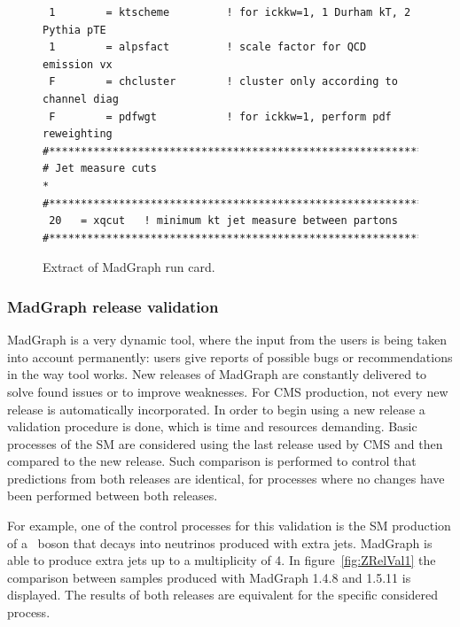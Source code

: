 \begin{itemize}
\begin{figure}[!Hhtbp]
\begin{center}
\begin{minipage}[c]{0.7\textwidth}
\begin{verbatim}
 1        = ktscheme         ! for ickkw=1, 1 Durham kT, 2 Pythia pTE
 1        = alpsfact         ! scale factor for QCD emission vx
 F        = chcluster        ! cluster only according to channel diag
 F        = pdfwgt           ! for ickkw=1, perform pdf reweighting
#*********************************************************************
# Jet measure cuts                                                   *
#*********************************************************************
 20   = xqcut   ! minimum kt jet measure between partons
#*********************************************************************
\end{verbatim}
\normalsize
        \end{minipage}
          \caption{Extract of MadGraph run card.}
          \label{fig:RunCard}
      \end{center}
    \end{figure}

\end{itemize}


\subsubsection{MadGraph release validation}

MadGraph is a very dynamic tool, where the input from the users is being taken into account permanently: users give reports of possible bugs or recommendations in the way tool works. New releases of MadGraph are constantly delivered to solve found issues or to improve weaknesses. For CMS production, not every new release is automatically incorporated. In order to begin using a new release a validation procedure is done, which is time and resources demanding. Basic processes of the SM are considered using the last release used by CMS and then compared to the new release. Such comparison is performed to control that predictions from both releases are identical, for processes where no changes have been performed between both releases. 

For example, one of the control processes for this validation is the SM production of a \Z~boson that decays into neutrinos produced with extra jets. MadGraph is able to produce extra jets up to a multiplicity of 4. In figure~\ref{fig:ZRelVal1} the comparison between samples produced with MadGraph 1.4.8 and 1.5.11 is displayed. The results of both releases are equivalent for the specific considered process.

